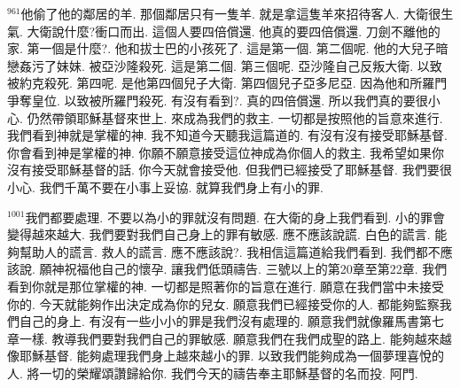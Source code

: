 \documentclass{book}
\begin{document}
$^{961}$他偷了他的鄰居的羊.
那個鄰居只有一隻羊.
就是拿這隻羊來招待客人.
大衛很生氣.
大衛說什麼?衝口而出.
這個人要四倍償還.
他真的要四倍償還.
刀劍不離他的家.
第一個是什麼?.
他和拔士巴的小孩死了.
這是第一個.
第二個呢.
他的大兒子暗戀姦污了妹妹.
被亞沙隆殺死.
這是第二個.
第三個呢.
亞沙隆自己反叛大衛.
以致被約克殺死.
第四呢.
是他第四個兒子大衛.
第四個兒子亞多尼亞.
因為他和所羅門爭奪皇位.
以致被所羅門殺死.
有沒有看到?.
真的四倍償還.
所以我們真的要很小心.
仍然帶領耶穌基督來世上.
來成為我們的救主.
一切都是按照他的旨意來進行.
我們看到神就是掌權的神.
我不知道今天聽我這篇道的.
有沒有沒有接受耶穌基督.
你會看到神是掌權的神.
你願不願意接受這位神成為你個人的救主.
我希望如果你沒有接受耶穌基督的話.
你今天就會接受他.
但我們已經接受了耶穌基督.
我們要很小心.
我們千萬不要在小事上妥協.
就算我們身上有小的罪.

$^{1001}$我們都要處理.
不要以為小的罪就沒有問題.
在大衛的身上我們看到.
小的罪會變得越來越大.
我們要對我們自己身上的罪有敏感.
應不應該說謊.
白色的謊言.
能夠幫助人的謊言.
救人的謊言.
應不應該說?.
我相信這篇道給我們看到.
我們都不應該說.
願神祝福他自己的懷孕.
讓我們低頭禱告.
三號以上的第20章至第22章.
我們看到你就是那位掌權的神.
一切都是照著你的旨意在進行.
願意在我們當中未接受你的.
今天就能夠作出決定成為你的兒女.
願意我們已經接受你的人.
都能夠監察我們自己的身上.
有沒有一些小小的罪是我們沒有處理的.
願意我們就像羅馬書第七章一樣.
教導我們要對我們自己的罪敏感.
願意我們在我們成聖的路上.
能夠越來越像耶穌基督.
能夠處理我們身上越來越小的罪.
以致我們能夠成為一個夢理喜悅的人.
將一切的榮耀頌讚歸給你.
我們今天的禱告奉主耶穌基督的名而投.
阿門.
\newpage
\end{document}
